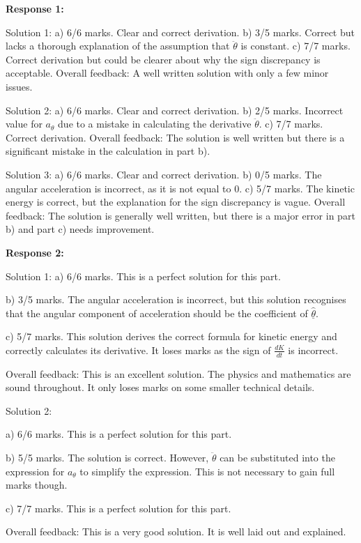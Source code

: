 \documentclass[a4paper,11pt]{article}
\begin{document}
\textbf{Response 1:}

Solution 1: 
a) 6/6 marks. Clear and correct derivation. 
b) 3/5 marks. Correct but lacks a thorough explanation of the assumption that \(\ddot{\theta}\) is constant. 
c) 7/7 marks. Correct derivation but could be clearer about why the sign discrepancy is acceptable. 
Overall feedback: A well written solution with only a few minor issues. 

Solution 2: 
a) 6/6 marks. Clear and correct derivation. 
b) 2/5 marks. Incorrect value for \( a_{\theta} \) due to a mistake in calculating the derivative \( \ddot{\theta} \). 
c) 7/7 marks. Correct derivation. 
Overall feedback: The solution is well written but there is a significant mistake in the calculation in part b). 

Solution 3:
a) 6/6 marks. Clear and correct derivation. 
b) 0/5 marks. The angular acceleration is incorrect, as it is not equal to 0.
c) 5/7 marks. The kinetic energy is correct, but the explanation for the sign discrepancy is vague. 
Overall feedback: The solution is generally well written, but there is a major error in part b) and part c) needs improvement. 

\bigskip    
\textbf{Response 2:}

Solution 1:
a) 6/6 marks. This is a perfect solution for this part.

b) 3/5 marks. The angular acceleration is incorrect, but this solution recognises that the angular component of acceleration should be the coefficient of \( \underline{\hat{\theta}} \).

c) 5/7 marks. This solution derives the correct formula for kinetic energy and correctly calculates its derivative. It loses marks as the sign of \( \frac{dK}{dt} \) is incorrect.

Overall feedback:
This is an excellent solution. The physics and mathematics are sound throughout. It only loses marks on some smaller technical details.

Solution 2:

a) 6/6 marks. This is a perfect solution for this part.

b) 5/5 marks. The solution is correct. However, \( \ddot{\theta} \) can be substituted into the expression for \( a_{\theta} \) to simplify the expression. This is not necessary to gain full marks though.

c) 7/7 marks. This is a perfect solution for this part.

Overall feedback:
This is a very good solution. It is well laid out and explained.
\end{document}

